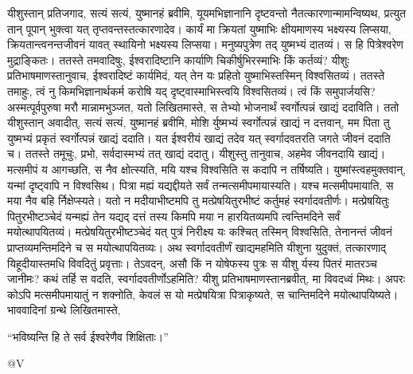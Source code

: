 \vakya यीशुस्तान् प्रतिजगाद, सत्यं सत्यं, युष्मानहं ब्रवीमि, यूयमभिज्ञानानि दृष्टवन्तो नैतत्कारणान्मामन्विष्यथ, प्रत्युत तान् पूपान् भुक्त्वा यत् तृप्तवन्तस्तत्कारणादेव।
\vakya कार्यं मा क्रियतां युष्माभिः क्षीयमाणस्य भक्ष्यस्य लिप्सया, क्रियतान्त्वनन्तजीवनं यावत् स्थायिनो भक्ष्यस्य लिप्सया। मनुष्यपुत्रेण तद् युष्मभ्यं दातव्यं। स हि पित्रेश्वरेण मुद्राङ्कितः।
\vakya ततस्ते तमवादिषुः, ईश्वरादिष्टानि कार्याणि चिकीर्षुभिरस्माभिः किं कर्तव्यं?
\vakya यीशुः प्रतिभाषमाणस्तानुवाच, ईश्वरादिष्टं कार्यमिदं, यत् तेन यः प्रहितो युष्माभिस्तस्मिन् विश्वसितव्यं।
\vakya ततस्ते तमाहुः, त्वं नु किमभिज्ञानार्थकर्म करोषि यद् दृष्ट्वास्माभिस्त्वयि विश्वसितव्यं। त्वं किं समुपार्जयसि?
\vakya अस्मत्पूर्वपुरुषा मरौ मान्नामभुञ्जत, यतो लिखितमास्ते, स तेभ्यो भोजनार्थं स्वर्गोत्पन्नं खाद्यं ददाविति।
\vakya ततो यीशुस्तान् अवादीत्, सत्यं सत्यं, युष्मानहं ब्रवीमि, मोशि र्युष्मभ्यं स्वर्गोत्पन्नं खाद्यं न दत्तवान्, मम पिता तु युष्मभ्यं प्रकृतं स्वर्गोत्पन्नं खाद्यं ददाति।
\vakya यत ईश्वरीयं खाद्यं तदेव यत् स्वर्गादवतरति जगते जीवनं ददाति च।
\vakya ततस्ते तमूचुः, प्रभो, सर्वदास्मभ्यं तत् खाद्यं ददातु।
\vakya यीशुस्तु तानुवाच, अहमेव जीवनदायि खाद्यं। मत्समीपं य आगच्छति, स नैव क्षोत्स्यति, मयि यश्च विश्वसिति स कदापि न तर्षिष्यति।
\vakya युष्मांस्त्वहमुक्तवान्, यन्मां दृष्ट्वापि न विश्वसिथ।
\vakya पित्रा मह्यं यद्यद्दीयते सर्वं तन्मत्समीपमायास्यति। यश्च मत्समीपमायाति, स मया नैव बहि र्निक्षेप्स्यते।
\vakya यतो न मदीयाभीष्टमपि तु मत्प्रेषयितुरभीष्टं कर्तुमहं स्वर्गादवतीर्णः।
\vakya मत्प्रेषयितुः पितुरभीष्टञ्चेदं यन्मह्यं तेन यद्यद् दत्तं तस्य किमपि मया न हारयितव्यमपि त्वन्तिमदिने सर्वं मयोत्थापयितव्यं।
\vakya मत्प्रेषयितुरभीष्टञ्चेदं यत् पुत्रं निरीक्ष्य यः कश्चित् तस्मिन् विश्वसिति, तेनानन्तं जीवनं प्राप्तव्यमन्तिमदिने च स मयोत्थापयितव्यः।
\vakya अथ स्वर्गादवतीर्णं खाद्यमहमिति यीशुना युदुक्तं, तत्कारणाद् यिहूदीयास्तमधि विवदितुं प्रवृत्ताः।
\vakya तेऽवदन्, असौ किं न योषेफस्य पुत्रः स यीशु र्यस्य पितरं मातरञ्च जानीमः? कथं तर्हि स वदति, स्वर्गादवतीर्णोऽहमिति?
\vakya यीशु प्रतिभाषमाणस्तानब्रवीत्, मा विवदध्वं मिथः।
\vakya अपरः कोऽपि मत्समीपमायातुं न शक्नोति, केवलं स यो मत्प्रेषयित्रा पित्राकृष्यते, स चान्तिमदिने मयोत्थापयिष्यते।
\vakya भाववादिनां ग्रन्थे लिखितमास्ते,
\begin{poem}
\startwithline “भविष्यन्ति हि ते सर्व ईश्वरेणैव शिक्षिताः।”
\end{poem}
@V\eoc
